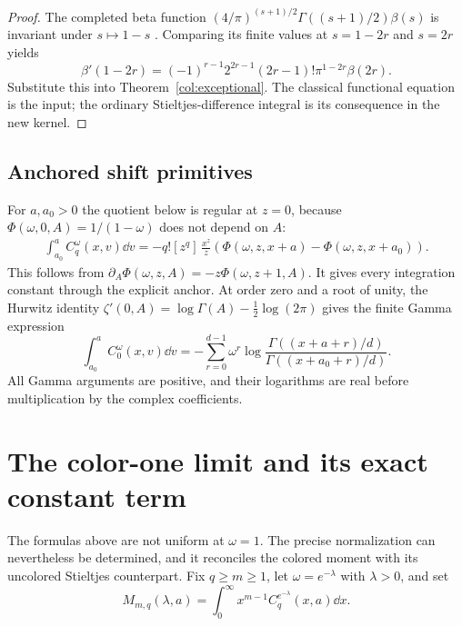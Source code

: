 \begin{proof}
The completed beta function
$(4/\pi)^{(s+1)/2}\Gamma((s+1)/2)\beta(s)$ is invariant under
$s\mapsto1-s$ \cite{dlmfdirichlet}. Comparing its finite values at
$s=1-2r$ and $s=2r$ yields
\[
 \beta'(1-2r)=
 (-1)^{r-1}2^{2r-1}(2r-1)!\pi^{1-2r}\beta(2r).
\]
Substitute this into Theorem~\ref{col:exceptional}.
The classical functional equation is the input; the ordinary
Stieltjes-difference integral is its consequence in the new kernel.
\end{proof}

\subsection{Anchored shift primitives}

For $a,a_0>0$ the quotient below is regular at $z=0$, because
$\Phi(\omega,0,A)=1/(1-\omega)$ does not depend on $A$:
\begin{equation}\label{col:primitive}
\begin{split}
 \int_{a_0}^a C_q^\omega(x,v)\dd v
  =-q![z^q]\,\frac{x^z}{z}
       \left(\Phi(\omega,z,x+a)-\Phi(\omega,z,x+a_0)\right).
\end{split}
\end{equation}
This follows from
$\partial_A\Phi(\omega,z,A)=-z\Phi(\omega,z+1,A)$.
It gives every integration constant through the explicit anchor.
At order zero and a root of unity, the Hurwitz identity
$\zeta'(0,A)=\log\Gamma(A)-\tfrac12\log(2\pi)$ gives the finite
Gamma expression
\begin{equation}\label{col:gamma-primitive}
 \int_{a_0}^a C_0^\omega(x,v)\dd v
  =-\sum_{r=0}^{d-1}\omega^r
       \log\frac{\Gamma((x+a+r)/d)}
                    {\Gamma((x+a_0+r)/d)}.
\end{equation}
All Gamma arguments are positive, and their logarithms are real
before multiplication by the complex coefficients.

\section{The color-one limit and its exact constant term}
\label{sec:color-limit}

The formulas above are not uniform at $\omega=1$. The precise
normalization can nevertheless be determined, and it reconciles the
colored moment with its uncolored Stieltjes counterpart.
Fix $q\ge m\ge1$, let $\omega=e^{-\lambda}$ with $\lambda>0$, and set
\[
 M_{m,q}(\lambda,a)=\int_0^\infty
                   x^{m-1}C_q^{e^{-\lambda}}(x,a)\dd x.
\]

